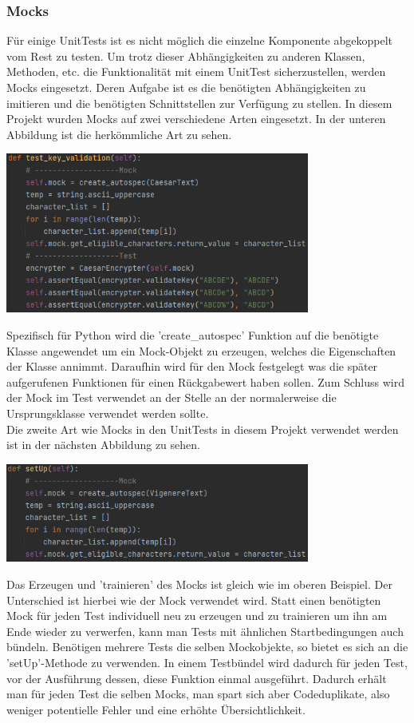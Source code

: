 \documentclass[12pt]{article}
\begin{document}
\subsubsection{Mocks}
Für einige UnitTests ist es nicht möglich die einzelne Komponente abgekoppelt vom Rest zu testen. Um trotz dieser Abhängigkeiten zu anderen Klassen, Methoden, etc. die Funktionalität mit einem UnitTest sicherzustellen, werden Mocks eingesetzt. Deren Aufgabe ist es die benötigten Abhängigkeiten zu imitieren und die benötigten Schnittstellen zur Verfügung zu stellen. In diesem Projekt wurden Mocks auf zwei verschiedene Arten eingesetzt. In der unteren Abbildung ist die herkömmliche Art zu sehen.
\begin{center}
	\includegraphics[width=10cm]{bilder/Mocks1.png}
\end{center}
Spezifisch für Python wird die 'create\_autospec' Funktion auf die benötigte Klasse angewendet um ein Mock-Objekt zu erzeugen, welches die Eigenschaften der Klasse annimmt. Daraufhin wird für den Mock festgelegt was die später aufgerufenen Funktionen für einen Rückgabewert haben sollen. Zum Schluss wird der Mock im Test verwendet an der Stelle an der normalerweise die Ursprungsklasse verwendet werden sollte.\\
Die zweite Art wie Mocks in den UnitTests in diesem Projekt verwendet werden ist in der nächsten Abbildung zu sehen.
\begin{center}
	\includegraphics[width=10cm]{bilder/Mocks2.png}
\end{center}
Das Erzeugen und 'trainieren' des Mocks ist gleich wie im oberen Beispiel. Der Unterschied ist hierbei wie der Mock verwendet wird. Statt einen benötigten Mock für jeden Test individuell neu zu erzeugen und zu trainieren um ihn am Ende wieder zu verwerfen, kann man Tests mit ähnlichen Startbedingungen auch bündeln. Benötigen mehrere Tests die selben Mockobjekte, so bietet es sich an die 'setUp'-Methode zu verwenden. In einem Testbündel wird dadurch für jeden Test, vor der Ausführung dessen, diese Funktion einmal ausgeführt. Dadurch erhält man für jeden Test die selben Mocks, man spart sich aber Codeduplikate, also weniger potentielle Fehler und eine erhöhte Übersichtlichkeit. 
\end{document}
